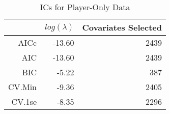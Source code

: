 \begin{table}[ht]
\centering
\begin{tabular}{rrr}
  \hline
 & $log(\lambda)$ & Covariates Selected \\ 
  \hline
AICc & -13.60 & 2439 \\ 
  AIC & -13.60 & 2439 \\ 
  BIC & -5.22 & 387 \\ 
  CV.Min & -9.36 & 2405 \\ 
  CV.1se & -8.35 & 2296 \\ 
   \hline
\end{tabular}
\caption{ICs for Player-Only Data} 
\label{tab:pl_ic}
\end{table}
